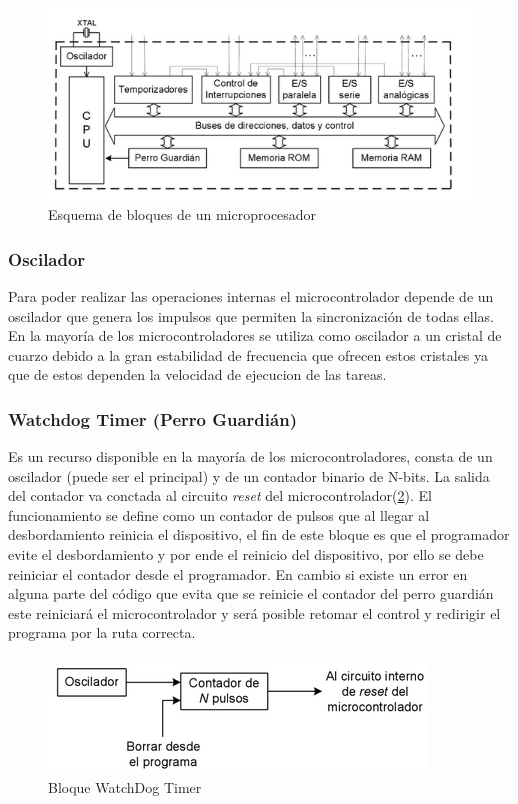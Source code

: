 \documentclass[letterpaper,12pt,oneside]{book}
\begin{document}
			\begin{figure}[!htpb]
				\centering
				\includegraphics[scale = 1.0]{Material de Consulta/BloqMicro.PNG}
				\caption[Esquema de bloques de un microprocesador]{Esquema de bloques de un microprocesador}
				\label{BloqMicro}
			\end{figure}

				\subsubsection{Oscilador}
				Para poder realizar las operaciones internas el microcontrolador depende de un oscilador que genera los impulsos que permiten la sincronización de todas ellas. En la mayoría de los microcontroladores se utiliza como oscilador a un cristal de cuarzo debido a la gran estabilidad de frecuencia que ofrecen estos cristales ya que de estos dependen la velocidad de ejecucion de las tareas.

				\subsubsection{Watchdog Timer (Perro Guardián)}
				Es un recurso disponible en la mayoría de los microcontroladores, consta de un oscilador (puede ser el principal) y de un contador binario de N-bits. La salida del contador va conctada al circuito \textit{reset} del microcontrolador(\ref{BloqWDT}). El funcionamiento se define como un contador de pulsos que al llegar al desbordamiento reinicia el dispositivo, el fin de este bloque es que el programador evite el desbordamiento y por ende el reinicio del dispositivo, por ello se debe reiniciar el contador desde el programador. En cambio si existe un error en alguna parte del código que evita que se reinicie el contador del perro guardián este reiniciará el microcontrolador y será posible retomar el control y redirigir el programa por la ruta correcta.

				\begin{figure}[!htpb]
					\centering
					\includegraphics[scale = 1.0]{Material de Consulta/BloqWDT.PNG}
					\caption[Bloque WatchDog Timer]{Bloque WatchDog Timer}
					\label{BloqWDT}
				\end{figure}
\end{document}
